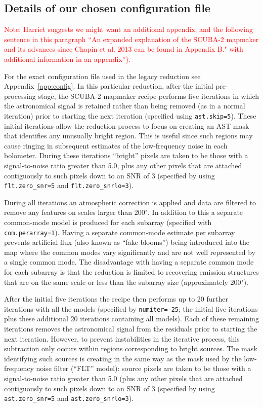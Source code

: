 \documentclass[twocolumn,times]{aastex6}
\newcommand{\note}[1]{\textcolor{red}{Note: #1}}
\begin{document}
\subsection{Details of our chosen configuration file}

\note{Harriet suggests we might want an additional appendix, and the
  following sentence in this paragraph ``An expanded explanation of
  the SCUBA-2 mapmaker and its advances since Chapin et al. 2013 can
  be found in Appendix B." with additional information in an
  appendix'').}



For the exact configuration file used in the legacy reduction see
Appendix~\ref{app:config}. In this particular reduction, after the initial
pre-processing stage, the SCUBA-2 mapmaker recipe performs five
iterations in which the astronomical signal is retained rather than
being removed (as in a normal iteration) prior to starting the next
iteration (specified using \texttt{ast.skip=5}). These initial
iterations allow the reduction process to focus on creating an AST mask
that identifies any unusually bright region. This is useful since such
regions may cause ringing in subsequent estimates of the low-frequency
noise in each bolometer. During these iterations ``bright'' pixels are
taken to be those with a signal-to-noise ratio greater than 5.0, plus
any other pixels that are attached contiguously to such pixels down
to an SNR of 3 (specified by using \texttt{flt.zero\_snr=5} and
\texttt{flt.zero\_snrlo=3}).

During all iterations an atmospheric correction is applied and data
are filtered to remove any features on scales larger than 200". In
addition to this a separate common-mode model is produced for each
subarray (specified with \texttt{com.perarray=1}). Having a separate
common-mode estimate per subarray prevents artificial flux (also
known as ``fake blooms'') being introduced into the map where the
common modes vary significantly and are not well represented by a
single common mode. The disadvantage with having a separate common
mode for each subarray is that the reduction is limited to recovering
emission structures that are on the same scale or less than the
subarray size (approximately 200").

After the initial five iterations the recipe then performs up to 20
further iterations with all the models (specified by
\texttt{numiter=-25}; the initial five iterations plus these additional 20
iterations containing all models). Each of these remaining iterations
removes the astronomical signal from the residuals prior to starting
the next iteration. However, to prevent instabilities in the iterative
process, this subtraction only occurs within regions corresponding to
bright sources.  The mask identifying such sources is creating in the
same way as the mask used by the low-frequency noise filter (``FLT''
model): source pixels are taken to be those with a signal-to-noise
ratio greater than 5.0 (plus any other pixels that are attached
contiguously to such pixels down to an SNR of 3 (specified by using
\texttt{ast.zero\_snr=5} and \texttt{ast.zero\_snrlo=3}).
\end{document}

